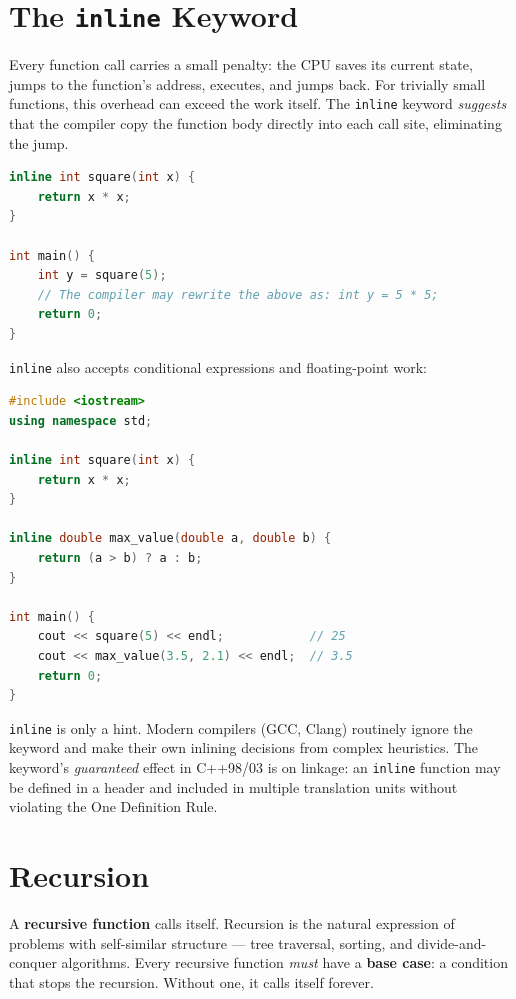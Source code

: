 \section{The \texttt{inline} Keyword}
\label{sec:inline}

Every function call carries a small penalty: the CPU saves its current state, jumps to the function's address, executes, and jumps back. For trivially small functions, this overhead can exceed the work itself. The \texttt{inline} keyword \textit{suggests} that the compiler copy the function body directly into each call site, eliminating the jump.

\begin{lstlisting}[language=C++, caption={inline suggestion}]
inline int square(int x) {
    return x * x;
}

int main() {
    int y = square(5);
    // The compiler may rewrite the above as: int y = 5 * 5;
    return 0;
}
\end{lstlisting}

\texttt{inline} also accepts conditional expressions and floating-point work:

\begin{lstlisting}[language=C++, caption={inline with a conditional expression}]
#include <iostream>
using namespace std;

inline int square(int x) {
    return x * x;
}

inline double max_value(double a, double b) {
    return (a > b) ? a : b;
}

int main() {
    cout << square(5) << endl;            // 25
    cout << max_value(3.5, 2.1) << endl;  // 3.5
    return 0;
}
\end{lstlisting}

\texttt{inline} is only a hint. Modern compilers (GCC, Clang) routinely ignore the keyword and make their own inlining decisions from complex heuristics. The keyword's \textit{guaranteed} effect in C++98/03 is on linkage: an \texttt{inline} function may be defined in a header and included in multiple translation units without violating the One Definition Rule.

\section{Recursion}
\label{sec:recursion}

A \textbf{recursive function} calls itself. Recursion is the natural expression of problems with self-similar structure --- tree traversal, sorting, and divide-and-conquer algorithms. Every recursive function \textit{must} have a \textbf{base case}: a condition that stops the recursion. Without one, it calls itself forever.

